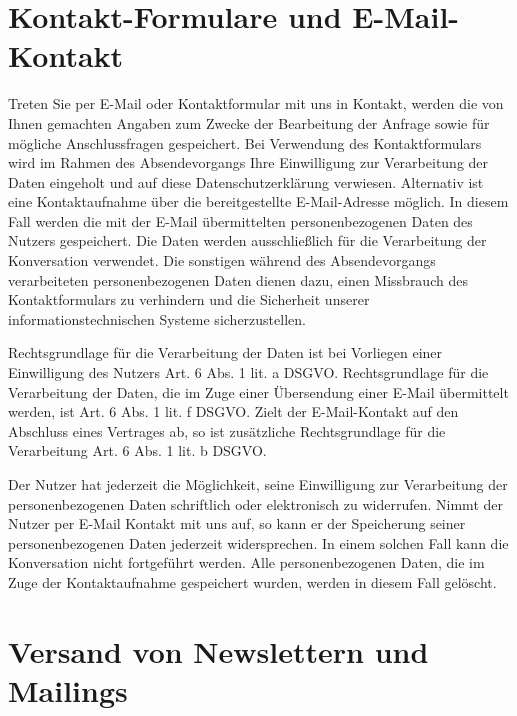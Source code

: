 \documentclass[
  fontsize=12pt,
  paper=a4,
  DIV14,
  parskip,
]{scrartcl}
\begin{document}
\section{Kontakt-Formulare und E-Mail-Kontakt}

Treten Sie per E-Mail oder Kontaktformular mit uns in Kontakt, werden die von
Ihnen gemachten Angaben zum Zwecke der Bearbeitung der Anfrage sowie für
mögliche Anschlussfragen gespeichert.
Bei Verwendung des Kontaktformulars wird im Rahmen des Absendevorgangs Ihre
Einwilligung zur Verarbeitung der Daten eingeholt und auf diese
Datenschutzerklärung verwiesen.
Alternativ ist eine Kontaktaufnahme über die bereitgestellte E-Mail-Adresse
möglich. In diesem Fall werden die mit der E-Mail übermittelten
personenbezogenen Daten des Nutzers gespeichert.
Die Daten werden ausschließlich für die Verarbeitung der Konversation
verwendet.
Die sonstigen während des Absendevorgangs verarbeiteten personenbezogenen
Daten dienen dazu, einen Missbrauch des Kontaktformulars zu verhindern und
die Sicherheit unserer informationstechnischen Systeme sicherzustellen.

Rechtsgrundlage für die Verarbeitung der Daten ist bei Vorliegen einer
Einwilligung des Nutzers Art. 6 Abs. 1 lit. a DSGVO. Rechtsgrundlage für die
Verarbeitung der Daten, die im Zuge einer Übersendung einer E-Mail
übermittelt werden, ist Art. 6 Abs. 1 lit. f DSGVO.
Zielt der E-Mail-Kontakt auf den Abschluss eines Vertrages ab, so ist
zusätzliche Rechtsgrundlage für die Verarbeitung Art. 6 Abs. 1 lit. b DSGVO.

Der Nutzer hat jederzeit die Möglichkeit, seine Einwilligung zur Verarbeitung
der personenbezogenen Daten schriftlich oder elektronisch zu widerrufen.
Nimmt der Nutzer per E-Mail Kontakt mit uns auf, so kann er der Speicherung
seiner personenbezogenen Daten jederzeit widersprechen.
In einem solchen Fall kann die Konversation nicht fortgeführt werden.
Alle personenbezogenen Daten, die im Zuge der Kontaktaufnahme gespeichert
wurden, werden in diesem Fall gelöscht.

\section{Versand von Newslettern und Mailings}
\end{document}
